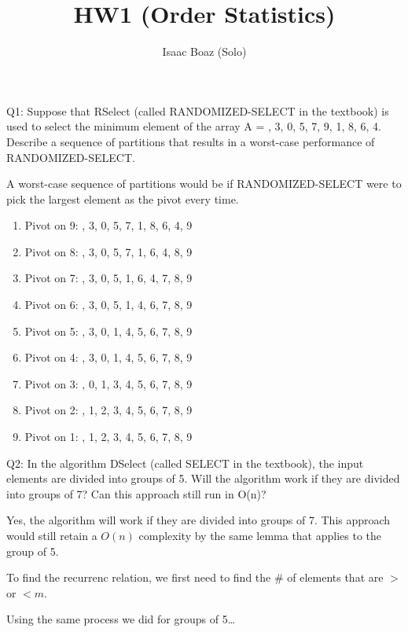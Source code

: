 \documentclass[a4paper,12pt]{article}
\title{HW1 (Order Statistics)}
\author{Isaac Boaz (Solo)}
\begin{document}
\maketitle

\noindent Q1: Suppose that RSelect (called RANDOMIZED-SELECT in the textbook) is used to select the minimum element of the array A = , 3, 0, 5, 7, 9, 1, 8, 6, 4\textrangle. Describe a sequence of partitions that results in a worst-case performance of RANDOMIZED-SELECT.

A worst-case sequence of partitions would be if RANDOMIZED-SELECT were to pick the largest element as the pivot every time.

\begin{enumerate}
    \item Pivot on 9: , 3, 0, 5, 7, 1, 8, 6, 4, 9\textrangle
    \item Pivot on 8: , 3, 0, 5, 7, 1, 6, 4, 8, 9\textrangle
    \item Pivot on 7: , 3, 0, 5, 1, 6, 4, 7, 8, 9\textrangle
    \item Pivot on 6: , 3, 0, 5, 1, 4, 6, 7, 8, 9\textrangle
    \item Pivot on 5: , 3, 0, 1, 4, 5, 6, 7, 8, 9\textrangle
    \item Pivot on 4: , 3, 0, 1, 4, 5, 6, 7, 8, 9\textrangle
    \item Pivot on 3: , 0, 1, 3, 4, 5, 6, 7, 8, 9\textrangle
    \item Pivot on 2: , 1, 2, 3, 4, 5, 6, 7, 8, 9\textrangle
    \item Pivot on 1: , 1, 2, 3, 4, 5, 6, 7, 8, 9\textrangle
\end{enumerate}

Q2: In the algorithm DSelect (called SELECT in the textbook), the input elements are divided into groups of 5. Will the algorithm work if they are divided into groups of 7? Can this approach still run in O(n)?

Yes, the algorithm will work if they are divided into groups of 7. This approach
would still retain a \(O(n)\) complexity by the same lemma that applies to the
group of 5.

To find the recurrenc relation, we first need to find the \# of elements that are \(>\) or \(< m\).

Using the same process we did for groups of 5\dots
\end{document}
